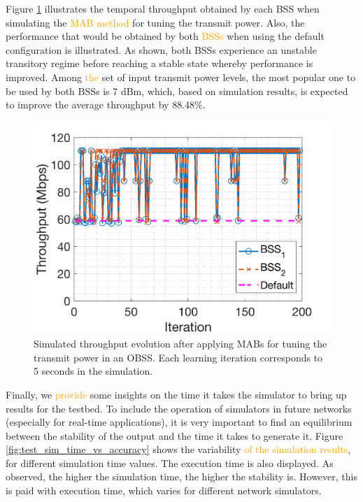 \documentclass[journal]{IEEEtran}
\begin{document}
	Figure \ref{fig:results_komondor} illustrates the temporal throughput obtained by each BSS when simulating the \textcolor{orange}{MAB method} for tuning the transmit power. Also, the performance that would be obtained by both \textcolor{orange}{BSSs} when using the default configuration is illustrated. As shown, both BSSs experience an unstable transitory regime before reaching a stable state whereby performance is improved. Among \textcolor{orange}{the} set of input transmit power levels, the most popular one to be used by both BSSs is 7 dBm, which, based on simulation results, is expected to improve the average throughput by 88.48\%.
	
	\begin{figure}[ht!]
	\centering
	\includegraphics[width=0.8\columnwidth]{throughput_evolution_komondor.png}
	\caption{Simulated throughput evolution after applying MABs for tuning the transmit power in an OBSS. Each learning iteration corresponds to 5 seconds in the simulation.}
	\label{fig:results_komondor}
	\end{figure}
	
	Finally, we \textcolor{orange}{provide} some insights on the time it takes the simulator to bring up results for the testbed. To include the operation of simulators in future networks (especially for real-time applications), it is very important to find an equilibrium between the stability of the output and the time it takes to generate it. Figure \ref{fig:test_sim_time_vs_accuracy} shows the variability \textcolor{orange}{of the simulation results}, for different simulation time values. The execution time is also displayed. As observed, the higher the simulation time, the higher the stability is. However, this is paid with execution time, which varies for different network simulators.
	
\end{document}
